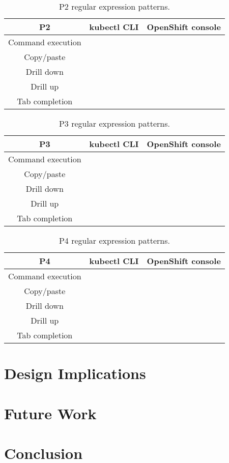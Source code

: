 \documentclass[11pt, oneside]{article}   	%
\begin{document}
\begin{table}
 \centering
  \begin{tabular}{ | c | c | c | } 
  \hline
  P2 & kubectl CLI & OpenShift console \\ 
  \hline
  Command execution &  &  \\ 
  \hline
  Copy/paste & & \\
  \hline
  Drill down & & \\
  \hline
  Drill up & & \\
  \hline
  Tab completion & & \\
  \hline
  \end{tabular}
 \caption{P2 regular expression patterns.}
\end{table}

\begin{table}
 \centering
  \begin{tabular}{ | c | c | c | } 
  \hline
  P3 & kubectl CLI & OpenShift console \\ 
  \hline
  Command execution &  &  \\ 
  \hline
  Copy/paste & & \\
  \hline
  Drill down & & \\
  \hline
  Drill up & & \\
  \hline
  Tab completion & & \\
  \hline
  \end{tabular}
 \caption{P3 regular expression patterns.}
\end{table}

\begin{table}
 \centering
  \begin{tabular}{ | c | c | c | } 
  \hline
  P4 & kubectl CLI & OpenShift console \\ 
  \hline
  Command execution &  &  \\ 
  \hline
  Copy/paste & & \\
  \hline
  Drill down & & \\
  \hline
  Drill up & & \\
  \hline
  Tab completion & & \\
  \hline
  \end{tabular}
 \caption{P4 regular expression patterns.}
\end{table}

\section{Design Implications}

\section{Future Work}

\section{Conclusion}



\end{document}
